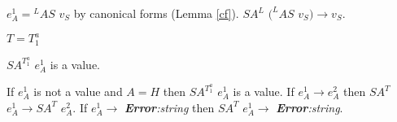 \begin{case}
\begin{subcase}
$e_{A}^{1}={^{L}A}S$ $v_{S}$ by canonical forms (Lemma \ref{cf}).  $SA^{L}$ $(^{L}AS$ $v_{S})\rightarrow v_{S}$.
\end{subcase}
\begin{subcase}
$T=T_{1}^{a}$

$SA^{T_{1}^{a}}$ $e_{A}^{1}$ is a value.
\end{subcase}
If $e_{A}^{1}$ is not a value and $A=H$ then $SA^{T_{1}^{a}}$ $e_{A}^{1}$ is a value.  If $e_{A}^{1}\rightarrow e_{A}^{2}$ then $SA^{T}$ $e_{A}^{1}\rightarrow SA^{T}$ $e_{A}^{2}$.  If $e_{A}^{1}\rightarrow$ \emph{\textbf{Error}:\;string} then $SA^{T}$ $e_{A}^{1}\rightarrow$ \emph{\textbf{Error}:\;string}.
\end{case}